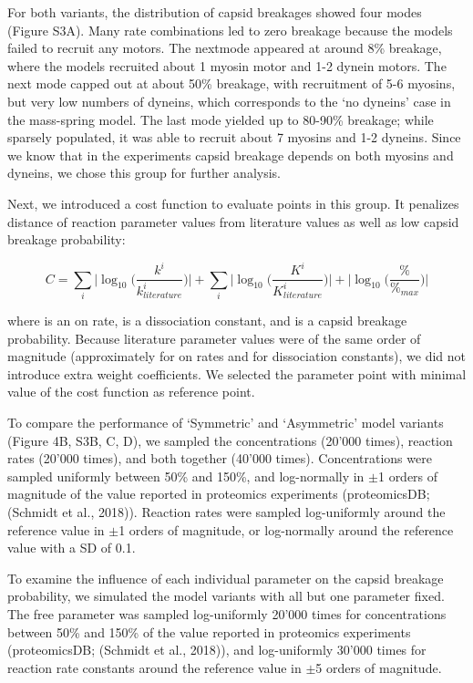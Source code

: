 For both variants, the distribution of capsid breakages showed four modes (Figure S3A). Many rate combinations led to zero breakage because the models failed to recruit any motors. The nextmode appeared at around 8\% breakage, where the models recruited about 1 myosin motor and 1-2 dynein motors. The next mode capped out at about 50\% breakage, with recruitment of 5-6 myosins, but very low numbers of dyneins, which corresponds to the ‘no dyneins’ case in the mass-spring model. The last mode yielded up to 80-90\% breakage; while sparsely populated, it was able to recruit about 7 myosins and 1-2 dyneins. Since we know that in the experiments capsid breakage depends on both myosins and dyneins, we chose this group for further analysis.

Next, we introduced a cost function to evaluate points in this group. It penalizes distance of reaction parameter values from literature values as well as low capsid breakage probability:

\begin{equation}
C = \sum_{i} \big| \log_{10} \big( \frac{k^i}{k^i_{literature}} \big) \big| + \sum_{i} \big| \log_{10} \big( \frac{K^i}{K^i_{literature}} \big) \big| + \big| \log_{10} \big( \frac{\%}{\%_{max}} \big) \big|
\end{equation}

where   is an on rate,   is a dissociation constant, and   is a capsid breakage probability. Because literature parameter values were of the same order of magnitude (approximately   for on rates and   for dissociation constants), we did not introduce extra weight coefficients. We selected the parameter point with minimal value of the cost function as reference point.

To compare the performance of ‘Symmetric’ and ‘Asymmetric’ model variants (Figure 4B, S3B, C, D), we sampled the concentrations (20’000 times), reaction rates (20’000 times), and both together (40’000 times). Concentrations were sampled uniformly between 50\% and 150\%, and log-normally in $\pm$1 orders of magnitude of the value reported in proteomics experiments (proteomicsDB; (Schmidt et al., 2018)). Reaction rates were sampled log-uniformly around the reference value in $\pm$1 orders of magnitude, or log-normally around the reference value with a SD of 0.1.

To examine the influence of each individual parameter on the capsid breakage probability, we simulated the model variants with all but one parameter fixed. The free parameter was sampled log-uniformly 20’000 times for concentrations between 50\% and 150\% of the value reported in proteomics experiments (proteomicsDB; (Schmidt et al., 2018)), and log-uniformly 30’000 times for reaction rate constants around the reference value in $\pm$5 orders of magnitude.

